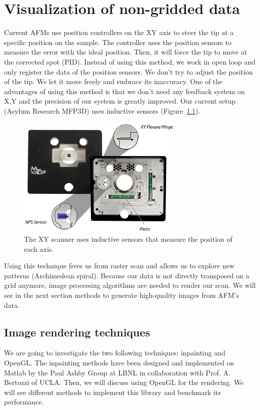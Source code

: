 \chapter{Visualization of non-gridded data}
 
Current AFMs use position controllers on the XY axis to steer the tip at a specific position on the sample. The controller uses the position sensors to measure the error with the ideal position. Then, it will force the tip to move at the corrected spot (PID). 
Instead of using this method, we work in open loop and only register the data of the position sensors. We don't try to adjust the position of the tip. We let it move freely and embrace its inaccuracy. One of the advantages of using this method is that we don't need any feedback system on X,Y and the precision of our system is greatly improved. Our current setup (Asylum Research MFP3D) uses inductive sensors (Figure~\ref{fig:mfp3d}).

\begin{figure}[!ht]
  \centering
  \includegraphics[scale=1]{images/sensorsmfp3d.jpg}
    \caption{The XY scanner uses inductive sensors that measure the position of each axis. \cite{linkmpf3d}}
  \label{fig:mfp3d}
\end{figure}

Using this technique frees us from raster scan and allows us to explore new patterns (Archimedean spiral). Because our data is not directly transposed on a grid  anymore, image processing algorithms are needed to render our scan. We will see in the next section methods to generate high-quality images from AFM's data.

\section{Image rendering techniques}

We are going to investigate the two following techniques: inpainting and OpenGL. The inpainting methods have been designed and implemented on Matlab by the Paul Ashby Group at LBNL in collaboration with Prof. A. Bertozzi of UCLA. Then, we will discuss using OpenGL for the rendering. We will see different methods to implement this library and benchmark its performance.

